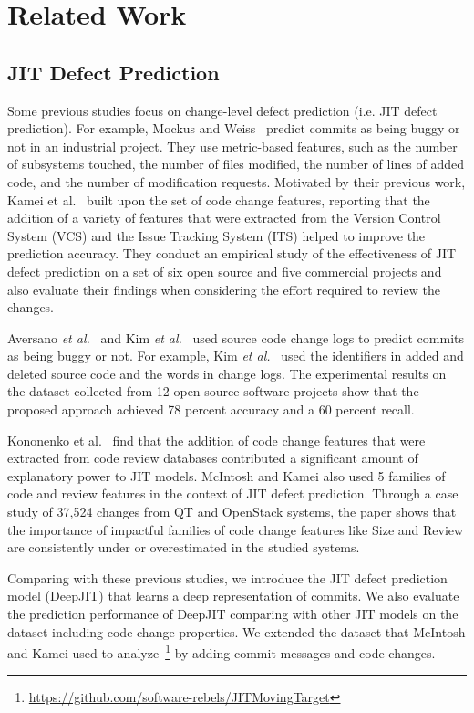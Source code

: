 \section{Related Work}
\label{sec:related}
\subsection{JIT Defect Prediction}
Some previous studies focus on change-level defect prediction (i.e. JIT defect prediction). For example, Mockus and Weiss~\cite{Mockus2000} predict commits as being buggy or not in an industrial project. They use metric-based features, such as the number of subsystems touched, the number of files modified, the number of lines of added code, and the number of modification requests. Motivated by their previous work, Kamei et al.~\cite{Kamei:2013:LES} built upon the set of code change features, reporting that the addition of a variety of features that were extracted from the Version Control System (VCS) and the Issue Tracking System (ITS) helped to improve the prediction accuracy. They conduct an empirical study of the effectiveness of JIT defect prediction on a set of six open source and five commercial projects and also evaluate their findings when considering the effort required to review the changes.

Aversano \emph{et al.}~\cite{Aversano2007} and Kim \emph{et al.}~\cite{Kim2008} used source code change logs to predict commits as being buggy or not. For example, Kim \emph{et al.}~\cite{Kim2008} used the identifiers in added and deleted source code and the words in change logs. The experimental results on the dataset collected from 12 open source software projects show that the proposed approach achieved 78 percent accuracy and a 60 percent recall.

Kononenko et al.~\cite{Kononenko:2015} find that the addition of code change features that were extracted from code review databases contributed a significant amount of explanatory power to JIT models. McIntosh and Kamei also used 5 families of code and review features in the context of JIT defect prediction. Through a case study of 37,524 changes from QT and OpenStack systems, the paper shows that the importance of impactful families of code change features like Size and Review are consistently under or overestimated in the studied systems.

Comparing with these previous studies, we introduce the JIT defect prediction model (DeepJIT) that learns a deep representation of commits. We also evaluate the prediction performance of DeepJIT comparing with other JIT models on the dataset including code change properties. We extended the dataset that McIntosh and Kamei used to analyze~\footnote{\url{https://github.com/software-rebels/JITMovingTarget}} by adding commit messages and code changes. 

